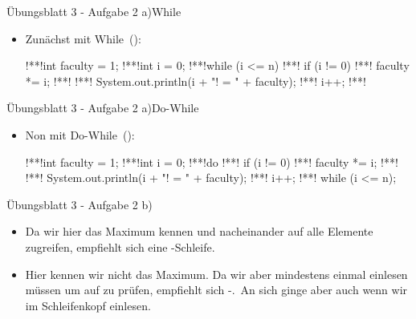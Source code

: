 \begin{frame}[t,fragile]{Übungsblatt 3 - Aufgabe 2 a)\hfill While}
    \begin{itemize}[<+(1)->]
        \item Zunächst mit While~():
\begin{plainjava}
!**!int faculty = 1;
!**!int i = 0;
!**!while (i <= n) {
!**!    if (i != 0) {
!**!        faculty *= i;
!**!    }
!**!    System.out.println(i + "! = " + faculty);
!**!    i++;
!**!}
\end{plainjava}
    \end{itemize}
\end{frame}

\begin{frame}[t,fragile]{Übungsblatt 3 - Aufgabe 2 a)\hfill Do-While}
    \begin{itemize}[<+(1)->]
        \item Non mit Do-While~():
\begin{plainjava}
!**!int faculty = 1;
!**!int i = 0;
!**!do {
!**!    if (i != 0) {
!**!        faculty *= i;
!**!    }
!**!    System.out.println(i + "! = " + faculty);
!**!    i++;
!**!} while (i <= n);
\end{plainjava}
    \end{itemize}
\end{frame}

\begin{frame}[t,fragile]{Übungsblatt 3 - Aufgabe 2 b)}
    \begin{itemize}[<+(1)->]
        \itemsep9pt
        \item {}\smallskip\pause\par
        Da wir hier das Maximum kennen und nacheinander auf alle Elemente zugreifen, empfiehlt sich eine -Schleife.
        \item {}\smallskip\pause\par
        Hier kennen wir nicht das Maximum. Da wir aber mindestens einmal einlesen müssen um auf  zu prüfen, empfiehlt sich -.\pause\ An sich ginge aber auch  wenn wir im Schleifenkopf einlesen.
    \end{itemize}
\end{frame}

